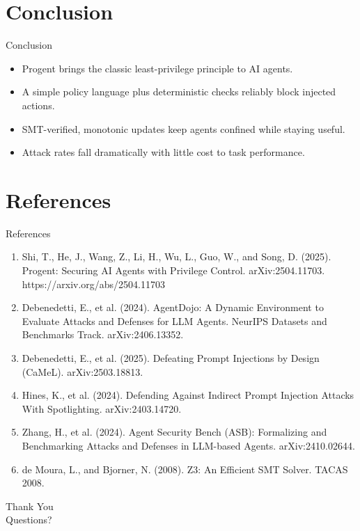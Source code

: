 \documentclass[10pt]{beamer}
\begin{document}
\section{Conclusion}
\begin{frame}{Conclusion}
\begin{itemize}
  \item Progent brings the classic least-privilege principle to AI agents.
  \item A simple policy language plus deterministic checks reliably block injected actions.
  \item SMT-verified, monotonic updates keep agents confined while staying useful.
  \item Attack rates fall dramatically with little cost to task performance.
\end{itemize}
\end{frame}
\section{References}
\begin{frame}[allowframebreaks]{References}
  \footnotesize
  \begin{enumerate}
    \item Shi, T., He, J., Wang, Z., Li, H., Wu, L., Guo, W., and Song, D. (2025). Progent: Securing AI Agents with Privilege Control. arXiv:2504.11703. https://arxiv.org/abs/2504.11703
    \item Debenedetti, E., et al. (2024). AgentDojo: A Dynamic Environment to Evaluate Attacks and Defenses for LLM Agents. NeurIPS Datasets and Benchmarks Track. arXiv:2406.13352.
    \item Debenedetti, E., et al. (2025). Defeating Prompt Injections by Design (CaMeL). arXiv:2503.18813.
    \item Hines, K., et al. (2024). Defending Against Indirect Prompt Injection Attacks With Spotlighting. arXiv:2403.14720.
    \item Zhang, H., et al. (2024). Agent Security Bench (ASB): Formalizing and Benchmarking Attacks and Defenses in LLM-based Agents. arXiv:2410.02644.
    \item de Moura, L., and Bjorner, N. (2008). Z3: An Efficient SMT Solver. TACAS 2008.
  \end{enumerate}
\end{frame}
\begin{frame}[plain]
  \begin{center}
    {\Huge Thank You}\\[1em]
    {\large Questions?}
  \end{center}
\end{frame}
\end{document}
